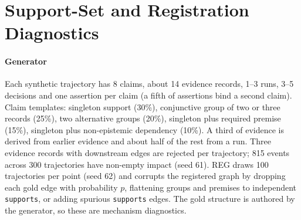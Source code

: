 \documentclass[journal]{IEEEtran}
\begin{document}
\begin{table}[!t]
\centering
\caption{DRS-1400 dependency-registration sensitivity (200 trials per $p_\text{missing}$, 20 claims/trial; seed 41). Ledger SCER is the metric defined in the main text, computed only over registered edges; ground-truth SCER additionally counts claims whose true evidence was invalidated but never linked.}
\label{tab:drs}
\end{table}

\section{Support-Set and Registration Diagnostics}
\label{sec:sup_reg}
\paragraph{Generator} Each synthetic trajectory has 8 claims, about 14 evidence records, 1--3 runs, 3--5 decisions and one assertion per claim (a fifth of assertions bind a second claim). Claim templates: singleton support (30\%), conjunctive group of two or three records (25\%), two alternative groups (20\%), singleton plus required premise (15\%), singleton plus non-epistemic dependency (10\%). A third of evidence is derived from earlier evidence and about half of the rest from a run. Three evidence records with downstream edges are rejected per trajectory; 815 events across 300 trajectories have non-empty impact (seed 61). REG draws 100 trajectories per point (seed 62) and corrupts the registered graph by dropping each gold edge with probability $p$, flattening groups and premises to independent \texttt{supports}, or adding spurious \texttt{supports} edges. The gold structure is authored by the generator, so these are mechanism diagnostics.
\end{document}
